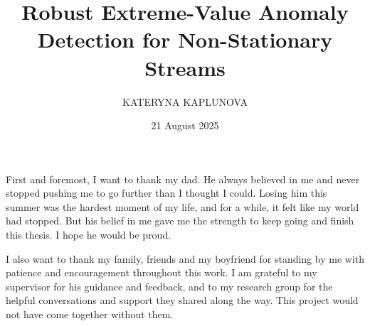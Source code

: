 \documentclass{statsmsc}
\title{Robust Extreme-Value Anomaly Detection for Non-Stationary Streams}
\author{KATERYNA KAPLUNOVA}
\date{21 August 2025}
\begin{document}
\maketitle

\declaration 

\begin{acknowledgements}
    First and foremost, I want to thank my dad. He always believed in me and never stopped pushing me to go further than I
    thought I could. Losing him this summer was the hardest moment of my life, and for a while, it felt like my world had 
    stopped. But his belief in me gave me the strength to keep going and finish this thesis. I hope he would be proud. 

    I also want to thank my family, friends and my boyfriend for standing by me with patience and encouragement throughout this work. 
    I am grateful to my supervisor for his guidance and feedback, and to my research group for the helpful conversations 
    and support they shared along the way. This project would not have come together without them. 
\end{acknowledgements}

\mainmatter
\end{document}

